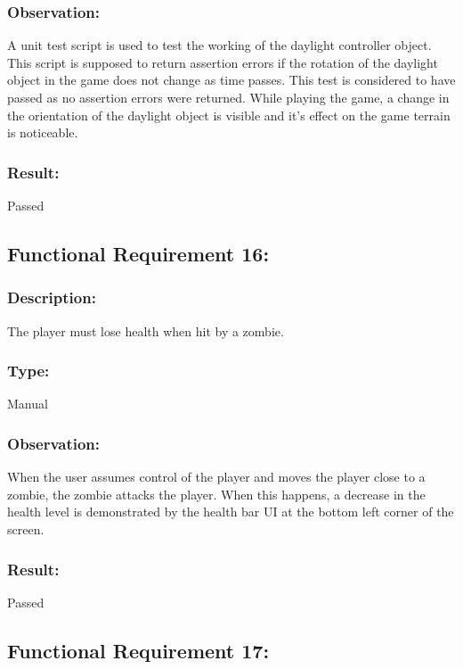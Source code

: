 \documentclass[12pt, titlepage]{article}
\begin{document}
\subsubsection{Observation: } A unit test script is used to test the working of the daylight controller object. This script is supposed to return assertion errors if the rotation of the daylight object in the game does not change as time passes. This test is considered to have passed as no assertion errors were returned.\newline
While playing the game, a change in the orientation of the daylight object is visible and it's effect on the game terrain is noticeable.

\subsubsection[Pass / Fail:] {Result: } Passed


\subsection{Functional Requirement 16: } 

\subsubsection{Description: }The player must lose health when hit by a zombie.

\subsubsection{Type: } Manual

\subsubsection{Observation: } When the user assumes control of the player and moves the player close to a zombie, the zombie attacks the player. When this happens, a decrease in the health level is demonstrated by the health bar UI at the bottom left corner of the screen.

\subsubsection[Pass / Fail:] {Result: } Passed


\subsection{Functional Requirement 17: } 
\end{document}
